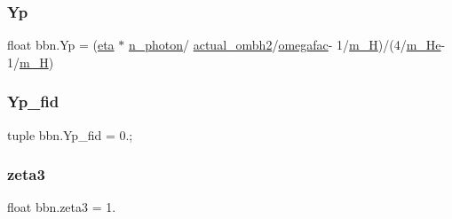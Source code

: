 \subsubsection{\texorpdfstring{Yp}{Yp}}
{\footnotesize\ttfamily float bbn.\+Yp = (\mbox{\hyperlink{namespacebbn_ace64c472b0c59f5fd0f811cd4dcdc2b4}{eta}} $\ast$ \mbox{\hyperlink{namespacebbn_afb075d5c6ea4d70b7b6b502224ffbac9}{n\+\_\+photon}}/ \mbox{\hyperlink{namespacebbn_a693a5d1e528c587feab5af05b0434b93}{actual\+\_\+ombh2}}/\mbox{\hyperlink{namespacebbn_a7add864cda923ca0a40fda7711df51d5}{omegafac}}-\/ 1/\mbox{\hyperlink{namespacebbn_af144f84053152a233d6f7fe2f505589f}{m\+\_\+H}})/(4/\mbox{\hyperlink{namespacebbn_a5659e9c09b2847f14bb66c2d73e68191}{m\+\_\+\+He}}-\/1/\mbox{\hyperlink{namespacebbn_af144f84053152a233d6f7fe2f505589f}{m\+\_\+H}})}

\mbox{\label{namespacebbn_a8b00dee4a160e555ce5c5b347787d15e}} 
\subsubsection{\texorpdfstring{Yp\+\_\+fid}{Yp\_fid}}
{\footnotesize\ttfamily tuple bbn.\+Yp\+\_\+fid = 0.;}

\mbox{\label{namespacebbn_a43d9d2d8599e22e361b96747ee7210fe}} 
\subsubsection{\texorpdfstring{zeta3}{zeta3}}
{\footnotesize\ttfamily float bbn.\+zeta3 = 1.}

